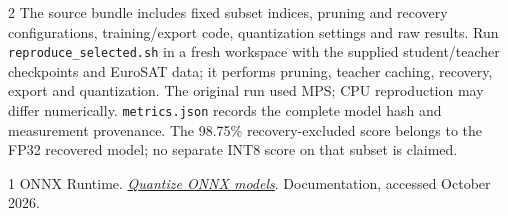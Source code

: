 \documentclass[10pt,letterpaper]{article}
\newcommand{\code}[1]{\texttt{\small #1}}
\begin{document}
\begin{multicols}{2}
The source bundle includes fixed subset indices, pruning and recovery configurations, training/export code, quantization settings and raw results. Run \code{reproduce\_selected.sh} in a fresh workspace with the supplied student/teacher checkpoints and EuroSAT data; it performs pruning, teacher caching, recovery, export and quantization. The original run used MPS; CPU reproduction may differ numerically. \code{metrics.json} records the complete model hash and measurement provenance. The 98.75\% recovery-excluded score belongs to the FP32 recovered model; no separate INT8 score on that subset is claimed.
\vspace{-3pt}
\begin{thebibliography}{1}\small\setlength{\itemsep}{1pt}\setlength{\parskip}{0pt}
 ONNX Runtime. \href{https://onnxruntime.ai/docs/performance/model-optimizations/quantization.html}{\emph{Quantize ONNX models}}. Documentation, accessed October 2026.
\end{thebibliography}
\end{multicols}

\end{document}
